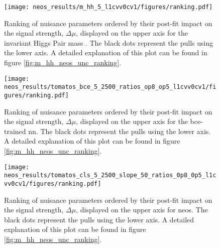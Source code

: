 \begin{figure}
    \centering
    \texttt{[image: neos\_results/m\_hh\_5\_l1cvv0cv1/figures/ranking.pdf]}
    \caption[]{Ranking of nuisance parameters ordered by their post-fit impact on the signal strength, $\Delta\mu$, displayed on the upper axis for the invariant Higgs Pair mass \mhh{}. The black dots represent the pulls using the lower axis. A detailed explanation of this plot can be found in figure \ref{fig:m_hh_neos_unc_ranking}.}
    \label{fig:m_hh_full_sys_ranking}
\end{figure}
\begin{figure}
    \centering
    \texttt{[image: neos\_results/tomatos\_bce\_5\_2500\_ratios\_op8\_op5\_l1cvv0cv1/figures/ranking.pdf]}
    \caption[]{Ranking of nuisance parameters ordered by their post-fit impact on the signal strength, $\Delta\mu$, displayed on the upper axis for the \ac{bce}-trained \ac{nn}. The black dots represent the pulls using the lower axis. A detailed explanation of this plot can be found in figure \ref{fig:m_hh_neos_unc_ranking}.}
    \label{fig:bce_full_sys_ranking}
\end{figure}
\begin{figure}
    \centering
    \texttt{[image: neos\_results/tomatos\_cls\_5\_2500\_slope\_50\_ratios\_0p8\_0p5\_l1cvv0cv1/figures/ranking.pdf]}
    \caption[]{Ranking of nuisance parameters ordered by their post-fit impact on the signal strength, $\Delta\mu$, displayed on the upper axis for \ac{neos}. The black dots represent the pulls using the lower axis. A detailed explanation of this plot can be found in figure \ref{fig:m_hh_neos_unc_ranking}.}
    \label{fig:neos_full_sys_ranking}
\end{figure}